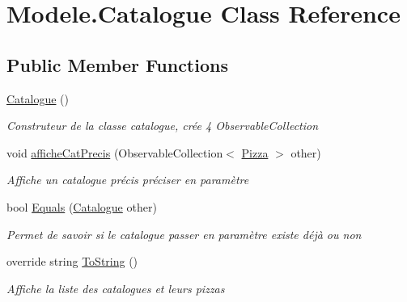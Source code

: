 \hypertarget{classModele_1_1Catalogue}{}\section{Modele.\+Catalogue Class Reference}
\label{classModele_1_1Catalogue}
\subsection*{Public Member Functions}
\begin{DoxyCompactItemize}
\item 
\hyperlink{classModele_1_1Catalogue_a93f737e4c7e5e5b4ff8317b899d15d3b}{Catalogue} ()
\begin{DoxyCompactList}\small\item\em Construteur de la classe catalogue, crée 4 Observable\+Collection \end{DoxyCompactList}\item 
void \hyperlink{classModele_1_1Catalogue_ab7da274b56b04b968d89d05dbdccf097}{affiche\+Cat\+Precis} (Observable\+Collection$<$ \hyperlink{classModele_1_1Pizza}{Pizza} $>$ other)
\begin{DoxyCompactList}\small\item\em Affiche un catalogue précis préciser en paramètre \end{DoxyCompactList}\item 
bool \hyperlink{classModele_1_1Catalogue_a244cf5ce13ec8127f3585f3b5fa73dc9}{Equals} (\hyperlink{classModele_1_1Catalogue}{Catalogue} other)
\begin{DoxyCompactList}\small\item\em Permet de savoir si le catalogue passer en paramètre existe déjà ou non \end{DoxyCompactList}\item 
override string \hyperlink{classModele_1_1Catalogue_a09a355cd9bd72cd019bc7c68dd2d4b0a}{To\+String} ()
\begin{DoxyCompactList}\small\item\em Affiche la liste des catalogues et leurs pizzas \end{DoxyCompactList}\end{DoxyCompactItemize}
